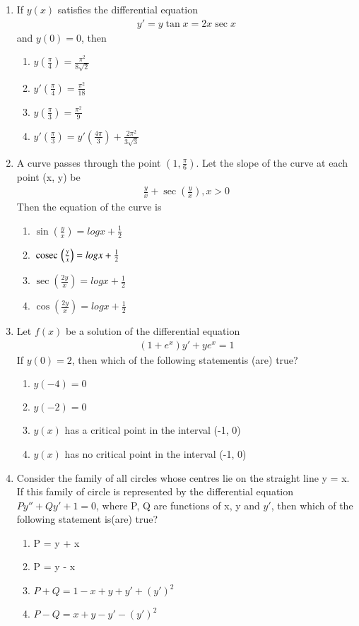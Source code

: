 \begin{enumerate}[label=\arabic*.,ref=\thesubsection.\theenumi]
\item If $y(x)$ satisfies the differential equation 
\begin{align*}
y' = y\tan x = 2x\sec x 
\end{align*}
and $y(0) = 0$, then
\begin{enumerate}
\item $y\left(\frac{\pi}{4}\right) = \frac{\pi^2}{8\sqrt{2}}$
\item $y'\left(\frac{\pi}{4}\right) = \frac{\pi^2}{18}$
\item $y\left(\frac{\pi}{3}\right) = \frac{\pi^2}{9}$
\item $y'\left(\frac{\pi}{3}\right) =  y'\left(\frac{4\pi}{3}\right)+ \frac{2\pi^2}{3\sqrt{3}}$
\end{enumerate}

\item A curve passes through the point $\left(1, \frac{\pi}{6}\right)$. Let the slope of the curve at each point (x, y) be
\begin{align*}
\frac{y}{x} + \sec\left(\frac{y}{x}\right), x > 0
\end{align*}
Then the equation of the curve is
\begin{enumerate}
\item $\sin\left(\frac{y}{x}\right) = log x + \frac{1}{2}$
\item $\,\text{cosec}\,\left(\frac{y}{x}\right) = log x + \frac{1}{2}$
\item $\sec\left(\frac{2y}{x}\right) = log x + \frac{1}{2}$
\item $\cos\left(\frac{2y}{x}\right) = log x + \frac{1}{2}$
\end{enumerate}

\item Let $f(x)$ be a solution of the differential equation
\begin{align*}
(1 + e^x)y' + ye^x = 1
\end{align*}
If $y(0) = 2$, then which of the following statementis (are) true?
\begin{enumerate}
\item $y(-4) = 0$
\item $y(-2) = 0$
\item $y(x)$ has a critical point in the interval (-1, 0)
\item $y(x)$ has no critical point in the interval (-1, 0)
\end{enumerate}

\item Consider the family of all circles whose centres lie on the straight line y = x. If this family of circle is represented by the differential equation $Py'' + Qy' + 1 = 0$, where P, Q are functions of x, y and $y'$, then which of the following statement is(are) true?
\begin{enumerate}
\item P = y + x
\item P = y - x
\item $P + Q = 1 - x + y + y' + (y')^{2}$
\item $P - Q = x + y - y' - (y')^{2}$
\end{enumerate}


\end{enumerate}
